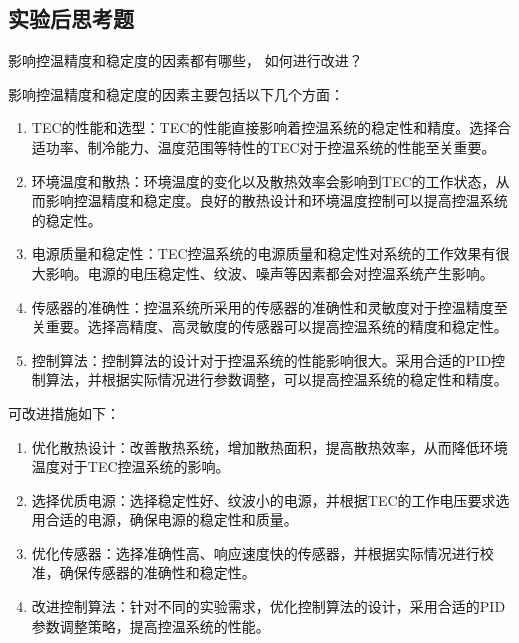\documentclass[dvipsnames, svgnames,a4paper,11pt]{article}
\begin{document}
		

\subsection{实验后思考题}	
	
    \begin{question}
        影响控温精度和稳定度的因素都有哪些， 如何进行改进？
    \end{question}

    影响控温精度和稳定度的因素主要包括以下几个方面：

        \begin{enumerate}
            \item TEC的性能和选型：TEC的性能直接影响着控温系统的稳定性和精度。选择合适功率、制冷能力、温度范围等特性的TEC对于控温系统的性能至关重要。
            \item 环境温度和散热：环境温度的变化以及散热效率会影响到TEC的工作状态，从而影响控温精度和稳定度。良好的散热设计和环境温度控制可以提高控温系统的稳定性。
            \item 电源质量和稳定性：TEC控温系统的电源质量和稳定性对系统的工作效果有很大影响。电源的电压稳定性、纹波、噪声等因素都会对控温系统产生影响。
            \item 传感器的准确性：控温系统所采用的传感器的准确性和灵敏度对于控温精度至关重要。选择高精度、高灵敏度的传感器可以提高控温系统的精度和稳定性。
            \item 控制算法：控制算法的设计对于控温系统的性能影响很大。采用合适的PID控制算法，并根据实际情况进行参数调整，可以提高控温系统的稳定性和精度。
        \end{enumerate}
    

    可改进措施如下：
    
        \begin{enumerate}
            \item 优化散热设计：改善散热系统，增加散热面积，提高散热效率，从而降低环境温度对于TEC控温系统的影响。
            \item 选择优质电源：选择稳定性好、纹波小的电源，并根据TEC的工作电压要求选用合适的电源，确保电源的稳定性和质量。
            \item 优化传感器：选择准确性高、响应速度快的传感器，并根据实际情况进行校准，确保传感器的准确性和稳定性。
            \item 改进控制算法：针对不同的实验需求，优化控制算法的设计，采用合适的PID参数调整策略，提高控温系统的性能。
        \end{enumerate}
\end{document}
